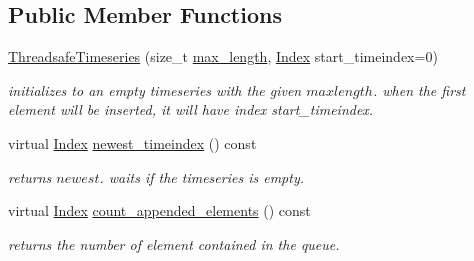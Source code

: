 \subsection*{Public Member Functions}
\begin{DoxyCompactItemize}
\item 
\hyperlink{classreal__time__tools_1_1ThreadsafeTimeseries_a06769598feb483bda198edb9c88c8de4}{Threadsafe\+Timeseries} (size\+\_\+t \hyperlink{classreal__time__tools_1_1ThreadsafeTimeseries_a14a749296f8728f9fa344e0bc63d6926}{max\+\_\+length}, \hyperlink{classreal__time__tools_1_1ThreadsafeTimeseries_a9364696c534468d7ad927883b16ca981}{Index} start\+\_\+timeindex=0)
\begin{DoxyCompactList}\small\item\em initializes to an empty timeseries with the given $ maxlength $. when the first element will be inserted, it will have index start\+\_\+timeindex. \end{DoxyCompactList}\item 
\mbox{\label{classreal__time__tools_1_1ThreadsafeTimeseries_a9d5495ecc8739d8f65056113ba915a8e}} 
virtual \hyperlink{classreal__time__tools_1_1ThreadsafeTimeseries_a9364696c534468d7ad927883b16ca981}{Index} \hyperlink{classreal__time__tools_1_1ThreadsafeTimeseries_a9d5495ecc8739d8f65056113ba915a8e}{newest\+\_\+timeindex} () const
\begin{DoxyCompactList}\small\item\em returns $ newest $. waits if the timeseries is empty. \end{DoxyCompactList}\item 
\mbox{\label{classreal__time__tools_1_1ThreadsafeTimeseries_adc27cfb168cd917301413a9342431f2a}} 
virtual \hyperlink{classreal__time__tools_1_1ThreadsafeTimeseries_a9364696c534468d7ad927883b16ca981}{Index} \hyperlink{classreal__time__tools_1_1ThreadsafeTimeseries_adc27cfb168cd917301413a9342431f2a}{count\+\_\+appended\+\_\+elements} () const
\begin{DoxyCompactList}\small\item\em returns the number of element contained in the queue. \end{DoxyCompactList}\item 
\mbox{\label{classreal__time__tools_1_1ThreadsafeTimeseries_a028364ef9654e90a3177dccabaafa098}} 

\end{DoxyCompactItemize}
